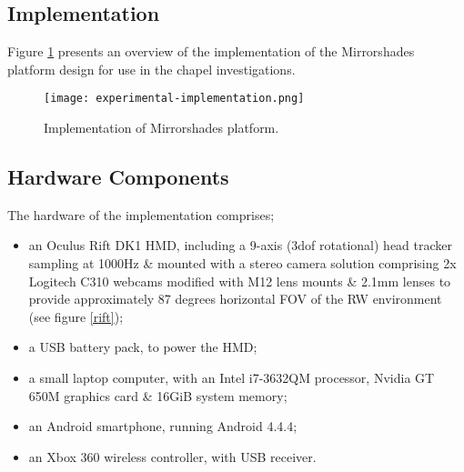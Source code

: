\subsection{Implementation}
Figure \ref{experimentalimplementation} presents an overview of the implementation of the Mirrorshades platform design for use in the chapel investigations.

\begin{figure}[h]
	\thispagestyle{empty}
	\begin{center}
		\texttt{[image: experimental-implementation.png]}
		\caption{Implementation of Mirrorshades platform.}
		\label{experimentalimplementation}
	\end{center}
\end{figure}


\subsection{Hardware Components}
The hardware of the implementation comprises;

\begin{itemize}
	\item an Oculus Rift DK1 HMD, including a 9-axis (3dof rotational) head tracker sampling at 1000Hz \& mounted with a stereo camera solution comprising 2x Logitech C310 webcams modified with M12 lens mounts \& 2.1mm lenses to provide approximately 87 degrees horizontal FOV of the RW environment (see figure \ref{rift});
	\item a USB battery pack, to power the HMD;
	\item a small laptop computer, with an Intel i7-3632QM processor, Nvidia GT 650M graphics card \& 16GiB system memory;
	\item an Android smartphone, running Android 4.4.4;
	\item an Xbox 360 wireless controller, with USB receiver.
\end{itemize}



